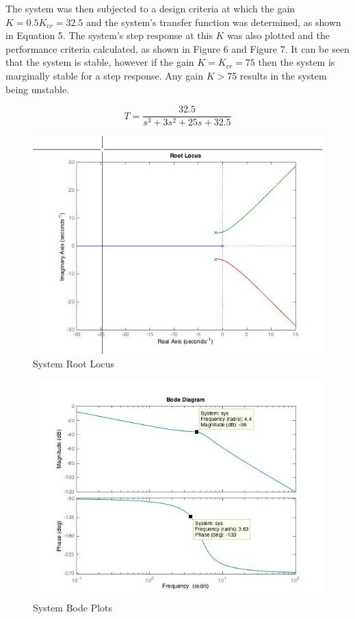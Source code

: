 \documentclass[12pt]{article}
\begin{document}
The system was then subjected to a design criteria at which the gain $K = 0.5K_{cr} = 32.5$ and the system's transfer function was determined, as shown in Equation 5. The system's step response at this $K$ was also plotted and the performance criteria calculated, as shown in Figure 6 and Figure 7. It can be seen that the system is stable, however if the gain $K=K_{cr}=75$ then the system is marginally stable for a step response. Any gain $K > 75$ results in the system being unstable.
\bigskip 

\begin{equation}
T = \frac{32.5}{s^3 + 3s^2 + 25s + 32.5}
\end{equation}

 \newpage
 
\begin{figure}[h!] %
   \centering
   \includegraphics[width=5in]{system_root_locus.jpg} 
   \caption{System Root Locus}
   \label{fig:example}
\end{figure}

\begin{figure}[h!] %
   \centering
   \includegraphics[width=5in]{system_bode_plots.jpg} 
   \caption{System Bode Plots}
   \label{fig:example}
\end{figure}
\end{document}
